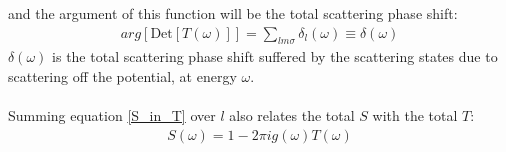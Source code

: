 \documentclass[twoside]{report}
\numberwithin{equation}{section}
\begin{document}
and the argument of this function will be the total scattering phase shift:
\begin{equation}\begin{aligned}
	\label{phase_in_T}
	arg\left[\text{Det}\left[ T(\omega) \right]\right] = \sum_{lm\sigma} \delta_l(\omega) \equiv \delta(\omega)
\end{aligned}\end{equation}
\(\delta(\omega)\) is the total scattering phase shift suffered by the scattering states due to scattering off the potential, at energy \(\omega\).
\\\\Summing equation \ref{S_in_T} over \(l\) also relates the total \(S\) with the total \(T\):
\begin{equation}\begin{aligned}
	S(\omega) = 1 - 2\pi i g(\omega) T(\omega)
\end{aligned}\end{equation}
\end{document}
